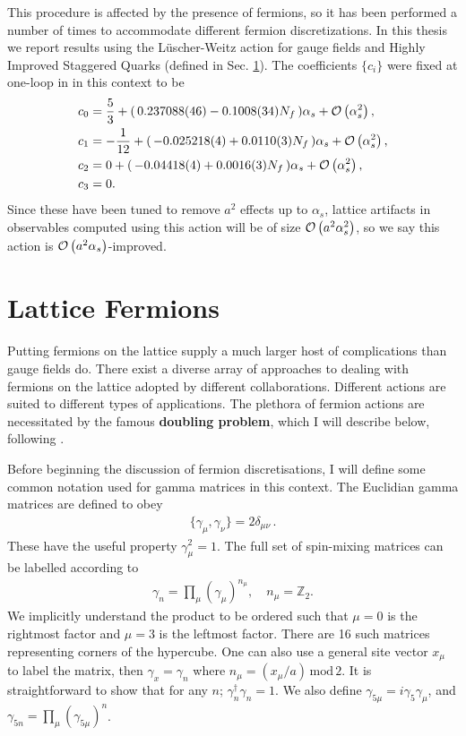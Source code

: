 This procedure is affected by the presence of fermions, so it has been performed a number of times to accommodate different fermion discretizations. In this thesis we report results using the L\"uscher-Weitz action for gauge fields and Highly Improved Staggered Quarks (defined in Sec. \ref{sec:fermions}). The coefficients $\{c_i\}$ were fixed at one-loop %
in \cite{Hart:2008sq} in this context to be
\begin{align}
  c_0& = {5\over 3} + ( \,0.237088(46) - 0.1008(34) N_f \,) \alpha_s + \mathcal{O}\left( \alpha_s^2 \right),\\
  c_1& = -{1\over 12} + ( \,-0.025218(4) + 0.0110(3) N_f \,) \alpha_s + \mathcal{O}\left( \alpha_s^2 \right),\\
  c_2& = 0 + ( \,-0.04418(4) + 0.0016(3) N_f \,) \alpha_s + \mathcal{O}\left( \alpha_s^2 \right), \\
  c_3& = 0.
\end{align}
Since these have been tuned to remove $a^2$ effects up to $\alpha_s$, lattice artifacts in observables computed using this action will be of size $\mathcal{O}\left( a^2\alpha_s^2 \right)$, so we say this action is $\mathcal{O}\left( a^2\alpha_s \right)$-improved.

\section{Lattice Fermions}
\label{sec:fermions}

Putting fermions on the lattice supply a much larger host of complications than gauge fields do. There exist a diverse array of approaches to dealing with fermions on the lattice adopted by different collaborations. Different actions are suited to different types of applications. The plethora of fermion actions are necessitated by the famous {\textbf{doubling problem}}, which I will describe below, following \cite{Follana:2006rc}.


Before beginning the discussion of fermion discretisations, I will define some common notation used for gamma matrices in this context. The Euclidian gamma matrices are defined to obey
\begin{align}
  \{\gamma_{\mu},\gamma_{\nu}\} = 2\delta_{\mu\nu}\,.
\end{align}
These have the useful property $\gamma_{\mu}^2=1$. The full set of spin-mixing matrices can be labelled according to
\begin{align}
  \gamma_n = \prod_{\mu} \left( \gamma_{\mu} \right)^{n_{\mu}}, \quad n_{\mu} = \mathbb{Z}_2.
\end{align}
We implicitly understand the product to be ordered such that $\mu=0$ is the rightmost factor and $\mu=3$ is the leftmost factor. There are 16 such matrices representing corners of the hypercube. One can also use a general site vector $x_{\mu}$ to label the matrix, then $\gamma_x = \gamma_n$ where $n_{\mu} = (x_{\mu}/a)\,\text{mod}\,2$. It is straightforward to show that for any $n$; $\gamma_n^{\dagger} \gamma_n = 1$. We also define $\gamma_{5\mu} = i\gamma_5\gamma_{\mu}$, and $\gamma_{5n} = \prod_{\mu}(\gamma_{5\mu})^n$.

